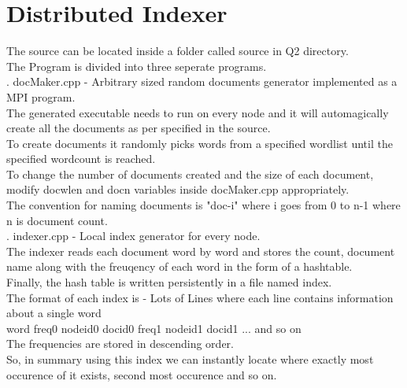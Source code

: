 \documentclass[11pt]{article}
\begin{document}
\section{Distributed Indexer}

\noindent The source can be located inside a folder called source in Q2 directory.\\

\noindent The Program is divided into three seperate programs.\\

. docMaker.cpp - Arbitrary sized random documents generator implemented as a MPI program.\\

\noindent The generated executable needs to run on every node and it will automagically create all the documents as per specified in the source.\\
To create documents it randomly picks words from a specified wordlist until the specified wordcount is reached.\\

\noindent To change the number of documents created and the size of each document, modify docwlen and docn variables inside docMaker.cpp appropriately.\\

\noindent The convention for naming documents is "doc-i" where i goes from 0 to n-1 where n is document count.\\

. indexer.cpp - Local index generator for every node.\\

\noindent The indexer reads each document word by word and stores the count, document name along with the freuqency of each word in the form of a hashtable.\\
Finally, the hash table is written persistently in a file named index.\\

\noindent The format of each index is - Lots of Lines where each line contains information about a single word\\
word freq0 nodeid0 docid0 freq1 nodeid1 docid1 ... and so on\\
The frequencies are stored in descending order.\\

\noindent So, in summary using this index we can instantly locate where exactly most occurence of it exists, second most occurence and so on.   \\
\end{document}
